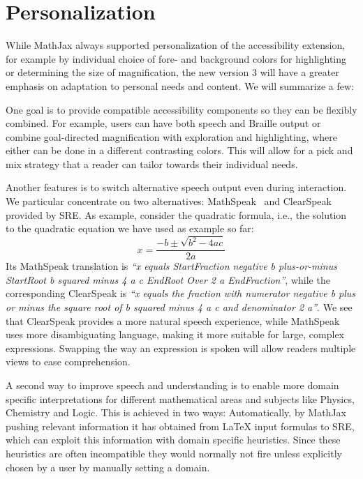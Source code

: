 \documentclass{sig-alternate}
\begin{document}
\section{Personalization}
\label{sec:challenges}

While MathJax always supported personalization of the accessibility extension,
for example by individual choice of fore- and background colors for highlighting or
determining the size of magnification, the new version 3 will have a greater
emphasis on adaptation to personal needs and content. We will summarize a few:

 One goal is to provide compatible accessibility
components so they can be flexibly combined.  For example, users can have both
speech and Braille output or combine goal-directed magnification with
exploration and highlighting, where either can be done in a different
contrasting colors. This will allow for a pick and mix strategy that a reader
can tailor towards their individual needs.

 Another features is to switch alternative speech
output even during interaction. We particular concentrate on two alternatives:
MathSpeak~\cite{MathSpeak} and ClearSpeak~\cite{frankel2016development} provided
by SRE. As example, consider the quadratic formula, i.e., the solution to the
quadratic equation we have used as example so far:
\[x = \frac{-b\pm\sqrt{b^2-4ac}}{2a}\] Its MathSpeak translation is \emph{``x
  equals StartFraction negative b plus-or-minus StartRoot b squared minus 4 a c
  EndRoot Over 2 a EndFraction''}, while the corresponding ClearSpeak is
\emph{``x equals the fraction with numerator negative b plus or minus the square
  root of b squared minus 4 a c and denominator 2 a''}.  We see that ClearSpeak
provides a more natural speech experience, while MathSpeak uses more
disambiguating language, making it more suitable for large, complex expressions.
Swapping the way an expression is spoken will allow readers multiple
views to ease comprehension.

 A second way to improve speech and
understanding is to enable more domain specific interpretations for different
mathematical areas and subjects like Physics, Chemistry and Logic. This is
achieved in two ways: Automatically, by MathJax pushing relevant information it
has obtained from {\LaTeX} input formulas to SRE, which can exploit this
information with domain specific heuristics. Since these heuristics are often
incompatible they would normally not fire unless explicitly chosen by a user by
manually setting a domain.
\end{document}
